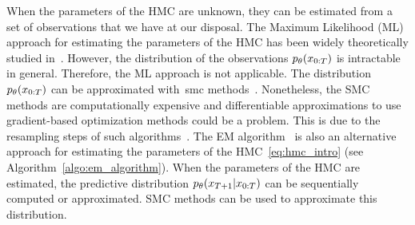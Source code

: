 

When the parameters of the HMC are unknown, they can be estimated from a set of
observations that we have at our disposal.
The Maximum Likelihood (ML) approach for estimating the parameters of the HMC
has been widely theoretically studied in~\cite{douc2004asymptotic,Douc-ML-MIS}.
However, the distribution of the observations $p_{\theta}(x_{0:T})$ is intractable 
in general. Therefore, the ML approach is not applicable. 
The distribution $p_{\theta}(x_{0:T})$ can be approximated 
with~\gls*{smc}
 methods~\citep{livredoucetshort,chopin2020introduction}.
Nonetheless, the SMC methods are computationally expensive and differentiable
approximations to use gradient-based optimization methods could be a 
problem. This is due to the resampling steps of such 
algorithms~\citep{kantas2015particle}.
The EM algorithm~\citep{dempster1977maximum} is also an alternative approach for
estimating the parameters of the HMC~\eqref{eq:hmc_intro} 
(see Algorithm~\ref{algo:em_algorithm}).
When the parameters of the HMC are estimated, the predictive
 distribution $p_{\theta}(x_{T+1}|x_{0:T})$ can be sequentially computed or approximated.
SMC methods can be used to approximate this distribution.

